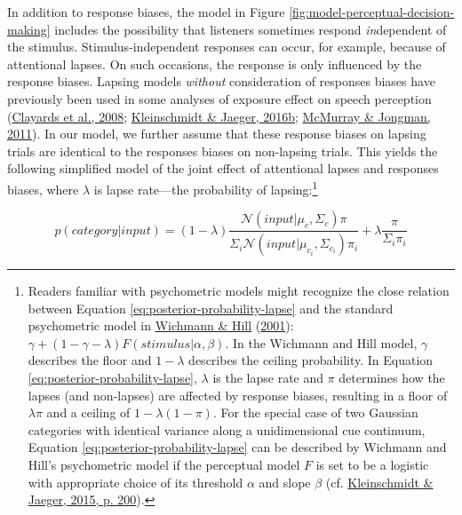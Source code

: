 \documentclass[
  11pt,
  english,
  man,floatsintext]{apa6}
\begin{document}
In addition to response biases, the model in Figure \ref{fig:model-perceptual-decision-making} includes the possibility that listeners sometimes respond \emph{in}dependent of the stimulus. Stimulus-independent responses can occur, for example, because of attentional lapses. On such occasions, the response is only influenced by the response biases. Lapsing models \emph{without} consideration of responses biases have previously been used in some analyses of exposure effect on speech perception (\protect\hyperlink{ref-clayards2008}{Clayards et al., 2008}; \protect\hyperlink{ref-kleinschmidt-jaeger2016cogsci}{Kleinschmidt \& Jaeger, 2016b}; \protect\hyperlink{ref-mcmurray-jongman2011}{McMurray \& Jongman, 2011}). In our model, we further assume that these response biases on lapsing trials are identical to the responses biases on non-lapsing trials. This yields the following simplified model of the joint effect of attentional lapses and responses biases, where \(\lambda\) is lapse rate---the probability of lapsing:\footnote{Readers familiar with psychometric models might recognize the close relation between Equation \eqref{eq:posterior-probability-lapse} and the standard psychometric model in \protect\hyperlink{ref-wichmann-hill2001}{Wichmann \& Hill} (\protect\hyperlink{ref-wichmann-hill2001}{2001}): \(\gamma + (1-\gamma-\lambda) F(stimulus | \alpha, \beta)\). In the Wichmann and Hill model, \(\gamma\) describes the floor and \(1-\lambda\) describes the ceiling probability. In Equation \eqref{eq:posterior-probability-lapse}, \(\lambda\) is the lapse rate and \(\pi\) determines how the lapses (and non-lapses) are affected by response biases, resulting in a floor of \(\lambda \pi\) and a ceiling of \(1 - \lambda(1 - \pi)\). For the special case of two Gaussian categories with identical variance along a unidimensional cue continuum, Equation \eqref{eq:posterior-probability-lapse} can be described by Wichmann and Hill's psychometric model if the perceptual model \(F\) is set to be a logistic with appropriate choice of its threshold \(\alpha\) and slope \(\beta\) (cf. \protect\hyperlink{ref-kleinschmidt-jaeger2015}{Kleinschmidt \& Jaeger, 2015, p. 200}).}

\begin{equation}\label{eq:posterior-probability-lapse}
p(category | input) = (1 - \lambda) \frac{\mathcal{N}\!\left( input | \mu_c, \Sigma_c \right) \pi}{\Sigma_i \mathcal{N}\!\left( input | \mu_{c_i}, \Sigma_{c_i} \right) \pi_i} + \lambda \frac{\pi}{\Sigma_i \pi_i}
\end{equation}
\end{document}
